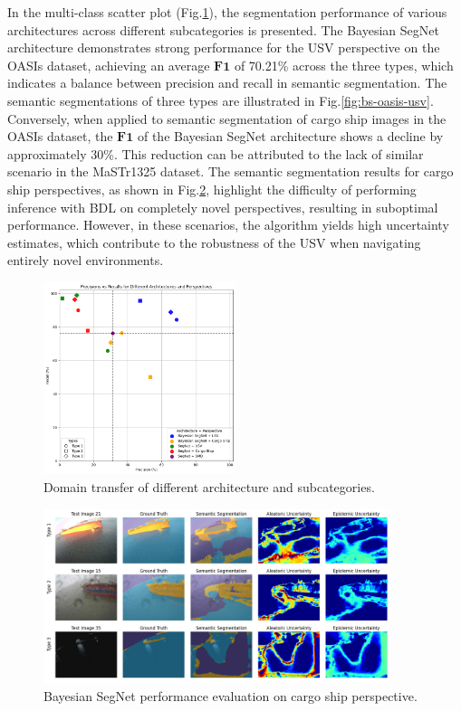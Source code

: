 In the multi-class scatter plot (Fig.\ref{fig:domain-transfer-disp}), the segmentation performance of various 
architectures across different subcategories is presented. The Bayesian SegNet architecture demonstrates strong 
performance for the USV perspective on the OASIs dataset, achieving an average $\mathbf{F1}$ of 70.21\% across the 
three types, which indicates a balance between precision and recall in semantic segmentation. The semantic segmentations 
of three types are illustrated in Fig.\ref{fig:bs-oasis-usv}. Conversely, when applied to semantic segmentation 
of cargo ship images in the OASIs dataset, the $\mathbf{F1}$ of the Bayesian SegNet architecture shows a decline by 
approximately 30\%. This reduction can be attributed to the lack of similar scenario in the MaSTr1325 dataset. 
The semantic segmentation results for cargo ship perspectives, as shown in Fig.\ref{fig:bs-oasis-cargo}, 
highlight the difficulty of performing inference with BDL on completely novel perspectives, resulting in 
suboptimal performance. However, in these scenarios, the algorithm yields high uncertainty estimates, which 
contribute to the robustness of the USV when navigating entirely novel environments. 
\begin{figure}[ht!]
    \centering
        \centering
        \includegraphics[width=0.5\textwidth]{figures/OASIs/domain-tranfer-PrRe.png}
    \caption{Domain transfer of different architecture and subcategories.}
    \label{fig:domain-transfer-disp}
\end{figure}
\begin{figure}[t!]
    \centering
        \centering
        \includegraphics[width=0.9\textwidth]{figures/OASIs/BayesianSegNet-cargo-panel.png}
    \caption{Bayesian SegNet performance evaluation on cargo ship perspective.}
    \label{fig:bs-oasis-cargo}
\end{figure}

